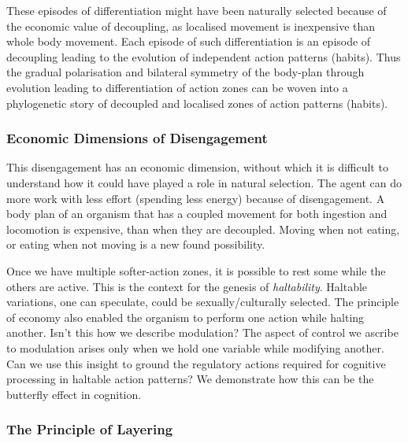 These episodes of differentiation might have been naturally selected because of the economic value of decoupling, as localised movement is inexpensive than whole body movement. Each episode of such differentiation is an episode of decoupling leading to the evolution of independent action patterns (habits). Thus the gradual polarisation and bilateral symmetry of the body-plan through evolution leading to differentiation of action zones can be woven into a phylogenetic story of decoupled and localised zones of action patterns (habits).

\subsubsection{Economic Dimensions of Disengagement}
This disengagement has an economic dimension, without which it is difficult to understand how it could have played a role in natural selection. The agent can do more work with less effort (spending less energy) because of disengagement. A body plan of an organism that has a coupled movement for both ingestion and locomotion is expensive, than when they are decoupled. Moving when not eating, or eating when not moving is a new found possibility.

Once we have multiple softer-action zones, it is possible to rest some while the others are active. This is the context for the genesis of \textit{haltability}. Haltable variations, one can speculate, could be sexually/culturally selected. The principle of economy also enabled the organism to perform one action while halting another. Isn't this how we describe modulation? The aspect of control we ascribe to modulation arises only when we hold one variable while modifying another. Can we use this insight to ground the regulatory actions required for cognitive processing in haltable action patterns? We demonstrate how this can be the butterfly effect in cognition.

\subsubsection{The Principle of Layering}
\label{subsec:principle_layering}

